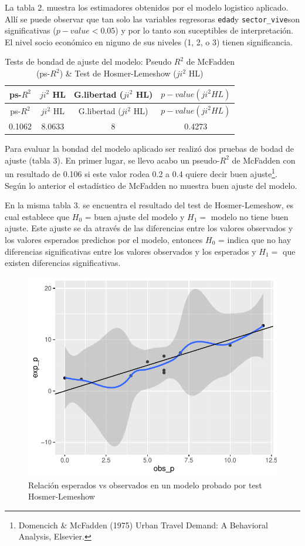 \documentclass[
]{article}
\begin{document}
La tabla 2. muestra los estimadores obtenidos por el modelo logistico
aplicado. Allí se puede observar que tan solo las variables regresoras
\texttt{edad}y \texttt{sector\_vive}son significativas
(\(p - value < 0.05\)) y por lo tanto son suceptibles de interpretación.
El nivel socio económico en niguno de sus niveles (1, 2, o 3) tienen
significancia.

\begin{longtable}[]{@{}cccc@{}}
\caption{Tests de bondad de ajuste del modelo: Pseudo \(R^2\) de
McFadden (ps-\(R^2\)) \& Test de Hosmer-Lemeshow (\(ji^2\)
HL)}\tabularnewline
\toprule
ps-\(R^2\) & \(ji^2\) HL & G.libertad (\(ji^2\) HL) &
\(p-value(ji^2 HL)\)\tabularnewline
\midrule
\endfirsthead
\toprule
ps-\(R^2\) & \(ji^2\) HL & G.libertad (\(ji^2\) HL) &
\(p-value(ji^2 HL)\)\tabularnewline
\midrule
\endhead
0.1062 & 8.0633 & 8 & 0.4273\tabularnewline
\bottomrule
\end{longtable}

Para evaluar la bondad del modelo aplicado ser realizó dos pruebas de
bodad de ajuste (tabla 3). En primer lugar, se llevo acabo un
pseudo-\(R^2\) de McFadden con un resultado de 0.106 si este valor rodea
0.2 a 0.4 quiere decir buen ajuste\footnote{Domencich \& McFadden (1975)
  Urban Travel Demand: A Behavioral Analysis, Elsevier.}. Según lo
anterior el estadístico de McFadden no muestra buen ajuste del modelo.

En la misma tabla 3. se encuentra el resultado del test de
Hosmer-Lemeshow, es cual establece que \(H_0\) = buen ajuste del modelo
y \(H_1 =\) modelo no tiene buen ajuste. Este ajuste se da através de
las diferencias entre los valores observados y los valores esperados
predichos por el modelo, entonces \(H_0\) = indica que no hay
diferencias significativas entre los valores observados y los esperados
y \(H_1 =\) que existen diferencias significativas.

\begin{figure}
\centering
\includegraphics{taller4_regresionlogist_files/figure-latex/gráfica de relación de esperados y observados Hosmer-lemeshow-1.pdf}
\caption{Relación esperados vs observados en un modelo probado por test
Hosmer-Lemeshow}
\end{figure}
\end{document}
